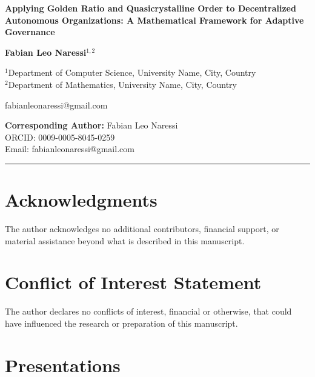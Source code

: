 \documentclass[12pt]{article}
\begin{document}
\begin{center}
\textbf{\Large Applying Golden Ratio and Quasicrystalline Order to Decentralized Autonomous Organizations: A Mathematical Framework for Adaptive Governance}
\end{center}

\vspace{0.5in}

\begin{center}
\textbf{Fabian Leo Naressi}$^{1,2}$
\end{center}

\begin{center}
$^{1}$Department of Computer Science, University Name, City, Country \\
$^{2}$Department of Mathematics, University Name, City, Country
\end{center}

\begin{center}
fabianleonaressi@gmail.com
\end{center}

\vspace{0.3in}

\begin{center}
\textbf{Corresponding Author:} Fabian Leo Naressi \\
ORCID: 0009-0005-8045-0259 \\
Email: fabianleonaressi@gmail.com
\end{center}

\vspace{0.5in}

\hrule
\vspace{0.3in}

\section*{Acknowledgments}

The author acknowledges no additional contributors, financial support, or material assistance beyond what is described in this manuscript.

\section*{Conflict of Interest Statement}

The author declares no conflicts of interest, financial or otherwise, that could have influenced the research or preparation of this manuscript.

\section*{Presentations}
\end{document}
